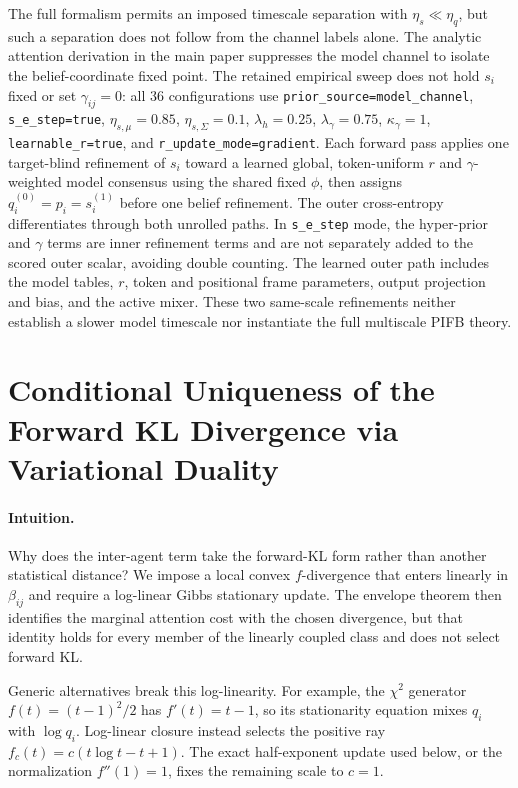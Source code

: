 \documentclass[twoside,11pt]{article}
\begin{document}
The full formalism permits an imposed timescale separation with $\eta_s\ll\eta_q$, but such a separation does not follow from the channel labels alone. The analytic attention derivation in the main paper suppresses the model channel to isolate the belief-coordinate fixed point. The retained empirical sweep does not hold $s_i$ fixed or set $\gamma_{ij}=0$: all 36 configurations use \texttt{prior\_source=model\_channel}, \texttt{s\_e\_step=true}, $\eta_{s,\mu}=0.85$, $\eta_{s,\Sigma}=0.1$, $\lambda_h=0.25$, $\lambda_\gamma=0.75$, $\kappa_\gamma=1$, \texttt{learnable\_r=true}, and \texttt{r\_update\_mode=gradient}. Each forward pass applies one target-blind refinement of $s_i$ toward a learned global, token-uniform $r$ and $\gamma$-weighted model consensus using the shared fixed $\phi$, then assigns $q_i^{(0)}=p_i=s_i^{(1)}$ before one belief refinement. The outer cross-entropy differentiates through both unrolled paths. In \texttt{s\_e\_step} mode, the hyper-prior and $\gamma$ terms are inner refinement terms and are not separately added to the scored outer scalar, avoiding double counting. The learned outer path includes the model tables, $r$, token and positional frame parameters, output projection and bias, and the active mixer. These two same-scale refinements neither establish a slower model timescale nor instantiate the full multiscale PIFB theory.


\section{Conditional Uniqueness of the Forward KL Divergence via Variational Duality}
\label{sec:supp_conditional_uniqueness}

\paragraph{Intuition.}
Why does the inter-agent term take the forward-KL form rather than another statistical distance? We impose a local convex $f$-divergence that enters linearly in $\beta_{ij}$ and require a log-linear Gibbs stationary update. The envelope theorem then identifies the marginal attention cost with the chosen divergence, but that identity holds for every member of the linearly coupled class and does not select forward KL.

Generic alternatives break this log-linearity. For example, the $\chi^2$ generator $f(t)=(t-1)^2/2$ has $f'(t)=t-1$, so its stationarity equation mixes $q_i$ with $\log q_i$. Log-linear closure instead selects the positive ray $f_c(t)=c(t\log t-t+1)$. The exact half-exponent update used below, or the normalization $f''(1)=1$, fixes the remaining scale to $c=1$.
\end{document}
